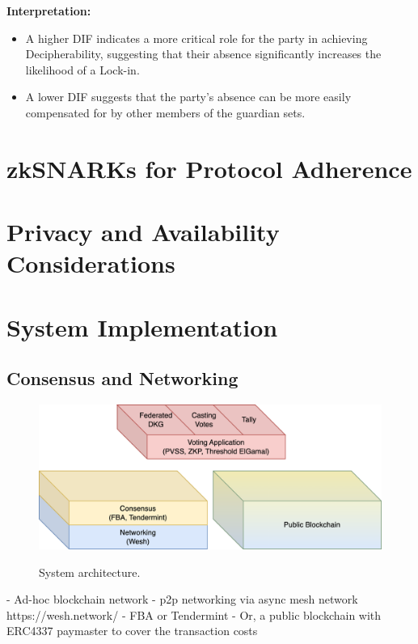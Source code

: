 \documentclass{article}
\begin{document}
\textbf{Interpretation:}
\begin{itemize}
    \item A higher DIF indicates a more critical role for the party in achieving Decipherability, suggesting that their absence significantly increases the likelihood of a Lock-in.
    \item A lower DIF suggests that the party's absence can be more easily compensated for by other members of the guardian sets.
\end{itemize}


\section{zkSNARKs for Protocol Adherence}

\section{Privacy and Availability Considerations}

\section{System Implementation}

\subsection{Consensus and Networking}

\begin{figure}
    \centering
    \includegraphics[width=\textwidth]{stack-bc.png}
    \label{fig:stack-bc}
    \caption{System architecture.}
\end{figure}

- Ad-hoc blockchain network
- p2p networking via async mesh network https://wesh.network/
- FBA or Tendermint
- Or, a public blockchain with ERC4337 paymaster to cover the transaction costs
\end{document}
